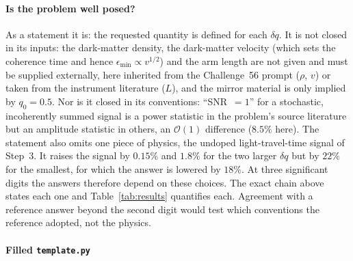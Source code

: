 \paragraph*{Is the problem well posed?}
As a statement it is: the requested quantity is defined for each $\delta q$. It is not closed in its inputs: the dark-matter density, the dark-matter velocity (which sets the coherence time and hence $\epsilon_{\min}\propto v^{1/2}$) and the arm length are not given and must be supplied externally, here inherited from the Challenge~56 prompt ($\rho$, $v$) or taken from the instrument literature ($L$), and the mirror material is only implied by $q_0=0.5$. Nor is it closed in its conventions: ``SNR~$=1$'' for a stochastic, incoherently summed signal is a power statistic in the problem's source literature but an amplitude statistic in others, an $\mathcal O(1)$ difference ($8.5\%$ here). The statement also omits one piece of physics, the undoped light-travel-time signal of Step~3. It raises the signal by $0.15\%$ and $1.8\%$ for the two larger $\delta q$ but by $22\%$ for the smallest, for which the answer is lowered by $18\%$. At three significant digits the answers therefore depend on these choices. The exact chain above states each one and Table~\ref{tab:results} quantifies each. Agreement with a reference answer beyond the second digit would test which conventions the reference adopted, not the physics.

\paragraph*{Filled \texttt{template.py}}




